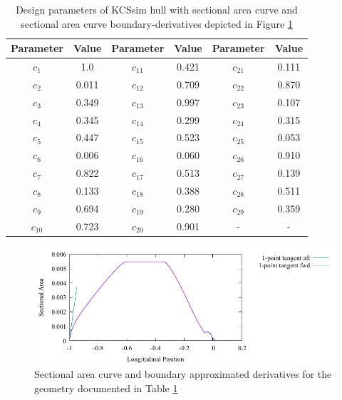 \documentclass{report}
\begin{document}
\begin{table}[H]
    \centering
    \begin{tabular}{|c|c|c|c|c|c|}
        \hline 
        Parameter & Value & Parameter & Value & Parameter & Value\\
        \hline 
        $c_1$ & 1.0 & $c_{11}$ & 0.421 & $c_{21}$ & 0.111 \\
        \hline 
        $c_2$ & 0.011 & $c_{12}$ & 0.709 & $c_{22}$ & 0.870\\
        \hline 
        $c_3$ & 0.349 & $c_{13}$ & 0.997 & $c_{23}$ & 0.107 \\
        \hline 
        $c_4$ & 0.345 & $c_{14}$ & 0.299 & $c_{24}$ & 0.315 \\
        \hline 
        $c_5$ & 0.447 & $c_{15}$ & 0.523 & $c_{25}$ & 0.053 \\
        \hline 
        $c_6$ & 0.006 & $c_{16}$ & 0.060 & $c_{26}$ & 0.910 \\
        \hline 
        $c_7$ & 0.822 & $c_{17}$ & 0.513 & $c_{27}$ & 0.139 \\
        \hline 
        $c_8$ & 0.133 & $c_{18}$ & 0.388 & $c_{28}$ & 0.511 \\
        \hline 
        $c_9$ & 0.694 & $c_{19}$ & 0.280 & $c_{29}$ & 0.359 \\
        \hline 
        $c_{10}$ & 0.723 & $c_{20}$ & 0.901 & - & - \\
        \hline 
    \end{tabular}
    \caption{Design parameters of KCSsim hull with sectional area curve and 
    sectional area curve boundary-derivatives depicted in Figure
    \ref{fig:test-4-sac-15}}
    \label{tab:test-4-15}
\end{table}
\begin{figure}[H]
    \centering
    \includegraphics[width = 0.7\linewidth]{figures/test-4-sac-15.pdf}
    \caption{Sectional area curve and boundary approximated derivatives for
    the geometry documented in Table \ref{tab:test-4-15}}
    \label{fig:test-4-sac-15}
\end{figure}
\end{document}

